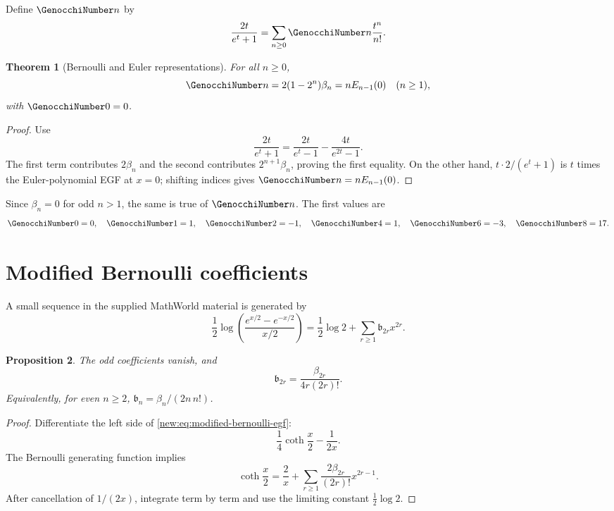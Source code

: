 \documentclass[11pt,a4paper,oneside,openany]{book}
\newtheorem{theorem}{Theorem}[chapter]
\newtheorem{proposition}[theorem]{Proposition}
\theoremstyle{definition}
\theoremstyle{remark}
\begin{document}
Define $\GenocchiNumber n$ by
\begin{equation}
 \frac{2t}{e^t+1}=\sum_{n\ge0}\GenocchiNumber n\frac{t^n}{n!}.
 \label{new:eq:genocchi-egf}
\end{equation}

\begin{theorem}[Bernoulli and Euler representations]
For all $n\ge0$,
\begin{equation}
 \GenocchiNumber n=2(1-2^n)\beta_n=nE_{n-1}(0)\quad(n\ge1),
 \label{new:eq:genocchi-relations}
\end{equation}
with $\GenocchiNumber0=0$.
\end{theorem}

\begin{proof}
Use
\[
 \frac{2t}{e^t+1}=\frac{2t}{e^t-1}-\frac{4t}{e^{2t}-1}.
\]
The first term contributes $2\beta_n$ and the second contributes
$2^{n+1}\beta_n$, proving the first equality.  On the other hand,
$t\cdot 2/(e^t+1)$ is $t$ times the Euler-polynomial EGF at $x=0$; shifting
indices gives $\GenocchiNumber n=nE_{n-1}(0)$.
\end{proof}

Since $\beta_n=0$ for odd $n>1$, the same is true of $\GenocchiNumber n$.  The first values
are
\[
 \GenocchiNumber0=0,\quad \GenocchiNumber1=1,\quad \GenocchiNumber2=-1,\quad \GenocchiNumber4=1,\quad
 \GenocchiNumber6=-3,\quad \GenocchiNumber8=17.
\]

\section{Modified Bernoulli coefficients}

A small sequence in the supplied MathWorld material is generated by
\begin{equation}
 \frac12\log\left(\frac{e^{x/2}-e^{-x/2}}{x/2}\right)
 =\frac12\log2+\sum_{r\ge1}\mathfrak b_{2r}x^{2r}.
 \label{new:eq:modified-bernoulli-egf}
\end{equation}

\begin{proposition}
The odd coefficients vanish, and
\begin{equation}
 \mathfrak b_{2r}=\frac{\beta_{2r}}{4r(2r)!}.
 \label{new:eq:modified-bernoulli}
\end{equation}
Equivalently, for even $n\ge2$,
$\mathfrak b_n=\beta_n/(2n\,n!)$.
\end{proposition}

\begin{proof}
Differentiate the left side of \eqref{new:eq:modified-bernoulli-egf}:
\[
 \frac14\coth\frac x2-\frac1{2x}.
\]
The Bernoulli generating function implies
\[
 \coth\frac x2=\frac2x+
 \sum_{r\ge1}\frac{2\beta_{2r}}{(2r)!}x^{2r-1}.
\]
After cancellation of $1/(2x)$, integrate term by term and use the limiting
constant $\frac12\log2$.
\end{proof}
\end{document}
